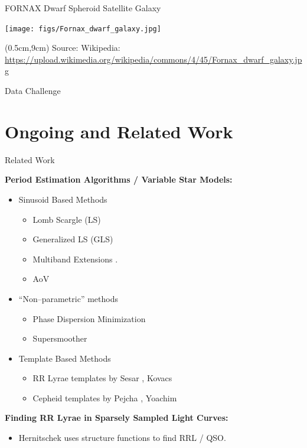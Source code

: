 \documentclass[12pt]{beamer}
\newcommand{\att}[1]{\begin{textblock*}{12cm}(0.5cm,9cm) %
  {\tiny Source: #1}
      \end{textblock*}}
\begin{document}
\begin{frame}{FORNAX Dwarf Spheroid Satellite Galaxy}
  \begin{center}
    \texttt{[image: figs/Fornax\_dwarf\_galaxy.jpg]}
  \end{center}
\att{Wikipedia: \url{https://upload.wikimedia.org/wikipedia/commons/4/45/Fornax_dwarf_galaxy.jpg}}
\end{frame}

\begin{frame}{Data Challenge}

\end{frame}

\section{Ongoing and Related Work}

\begin{frame}{Related Work}

\textbf{Period Estimation Algorithms / Variable Star Models:}
\begin{itemize}
\item Sinusoid Based Methods
\begin{itemize}
\item Lomb Scargle (LS) \cite{lomb1976least,scargle1982studies}
\item Generalized LS (GLS) \cite{zechmeister2009generalised}
\item Multiband Extensions \cite{vanderplas2015periodograms,long2014estimating}.
\item AoV \cite{schwarzenberg1996fast}
\end{itemize}
\item ``Non--parametric'' methods
\begin{itemize}
\item Phase Dispersion Minimization \cite{stellingwerf1978period}
\item Supersmoother \cite{sesar2010light}
\end{itemize}
\item Template Based Methods
\begin{itemize}
\item RR Lyrae templates by Sesar \cite{sesar2010light}, Kovacs \cite{kovacs2007computation}
\item Cepheid templates by Pejcha \cite{pejcha2012global}, Yoachim \cite{yoachim2009panoply}
\end{itemize}
\end{itemize}

\vspace{.1in}

\textbf{Finding RR Lyrae in Sparsely Sampled Light Curves:}
\begin{itemize}
\item Hernitschek \cite{hernitschek2016finding} uses structure functions to find RRL / QSO.
\end{itemize}


\end{frame}
\end{document}

